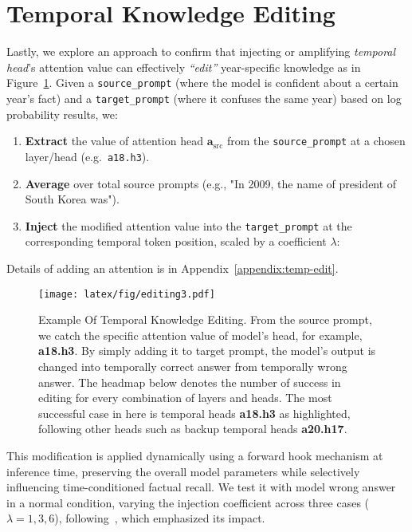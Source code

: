 \section{Temporal Knowledge Editing}
\label{subsubsec:temp-edit}
Lastly, we explore an approach to confirm that injecting or amplifying \emph{temporal head}'s attention value can effectively \emph{“edit”} year-specific knowledge as in Figure~\ref{fig:editing}. 
Given a \texttt{source\_prompt} (where the model is confident about a certain year’s fact) and a \texttt{target\_prompt} (where it confuses the same year) based on log probability results, we:
\begin{enumerate}
    \item \textbf{Extract} the value of attention head \(\mathbf{a}_{\mathrm{src}}\) from the \texttt{source\_prompt} at a chosen layer/head (e.g.\ \verb|a18.h3|).
    \item \textbf{Average} over total source prompts (e.g., "In 2009, the name of president of South Korea was").
    \item \textbf{Inject} the modified attention value into the \texttt{target\_prompt} at the corresponding temporal token position, scaled by a coefficient \(\lambda\):
\end{enumerate}
Details of adding an attention is in Appendix~\ref{appendix:temp-edit}.

\begin{figure}[t]
\vspace{-10pt}
\begin{center}
    \texttt{[image: latex/fig/editing3.pdf]}
\end{center}%
\vspace{-10pt}%
\caption{Example Of Temporal Knowledge Editing.
From the source prompt, we catch the specific attention value of model's head, for example, \textbf{a18.h3}.
By simply adding it to target prompt, the model's output is changed into temporally correct answer from temporally wrong answer.
The headmap below denotes the number of success in editing for every combination of layers and heads.
The most successful case in here is temporal heads \textbf{a18.h3} as highlighted, following other heads such as backup temporal heads \textbf{a20.h17}.
}
\label{fig:editing}
\vspace{-10pt}
\end{figure}

This modification is applied dynamically using a forward hook mechanism at inference time, preserving the overall model parameters while selectively influencing time-conditioned factual recall.  
We test it with model wrong answer in a normal condition, varying the injection coefficient across three cases (\(\lambda = 1, 3, 6\)), following~\citealp{actadd, actaddllama2}, which emphasized its impact.

